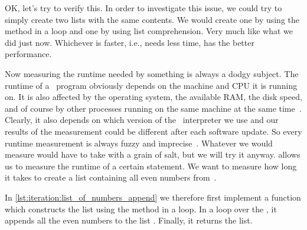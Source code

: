 %
%
%
%
%

OK, let's try to verify this.
In order to investigate this issue, we could try to simply create two lists with the same contents.
We would create one by using the  method in a loop and one by using list comprehension.
Very much like what we did just now.
Whichever is faster, i.e., needs less time, has the better performance.

Now measuring the runtime needed by something is always a dodgy subject.
The runtime of a \python\ program obviously depends on the machine and CPU it is running on.
It is also affected by the operating system, the available RAM, the disk speed, and of course by other processes running on the same machine at the same time~\cite{WCLTTCMY2014BOAAOSFFTTSP}.
Clearly, it also depends on which version of the \python\ interpreter we use and our results of the measurement could be different after each software update.
So every runtime measurement is always fuzzy and imprecise~\cite{WCLTTCMY2014BOAAOSFFTTSP}.
Whatever we would measure would have to take with a grain of salt, but we will try it anyway.%
%
%
%
 allows us to measure the runtime of a certain statement.
We want to measure how long it takes to create a list containing all even numbers from~.

In \cref{lst:iteration:list_of_numbers_append} we therefore first implement a function  which constructs the list using the  method in a loop.
In a loop over the , it appends all the even numbers to the list .
Finally, it returns the list.

